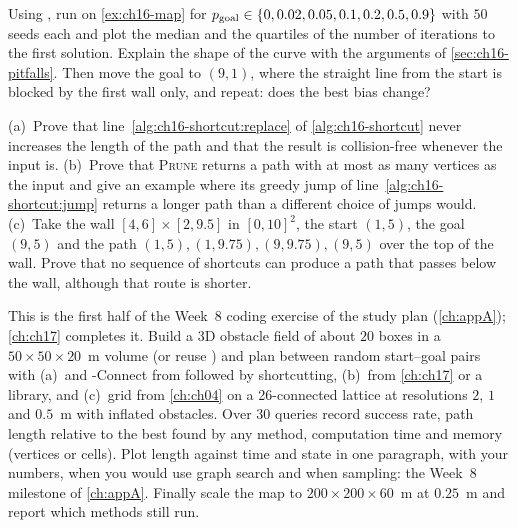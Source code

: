 \begin{exercise}
\label{exr:ch16-goalbias}
Using , run \rrt on \cref{ex:ch16-map} for
$p_{\mathrm{goal}}\in\left\{ 0,0.02,0.05,0.1,0.2,0.5,0.9 \right\}$ with $50$ seeds each
and plot the median and the quartiles of the number of iterations to the
first solution. Explain the shape of the curve with the arguments of
\cref{sec:ch16-pitfalls}. Then move the goal to $(9,1)$, where the straight
line from the start is blocked by the first wall only, and repeat: does the
best bias change?
\end{exercise}

\begin{exercise}[\difficulty{3}]
\label{exr:ch16-shortcut}
(a)~Prove that line~\ref{alg:ch16-shortcut:replace} of
\cref{alg:ch16-shortcut} never increases the length of the path and that
the result is collision-free whenever the input is. (b)~Prove that
\textsc{Prune} returns a path with at most as many vertices as the input and
give an example where its greedy jump of line~\ref{alg:ch16-shortcut:jump}
returns a longer path than a different choice of jumps would. (c)~Take the
wall $[4,6]\times[2,9.5]$ in $[0,10]^{2}$, the start $(1,5)$, the goal
$(9,5)$ and the path $(1,5),(1,9.75),(9,9.75),(9,5)$ over the top of the
wall. Prove that no sequence of shortcuts can produce a path that passes
below the wall, although that route is shorter.
\end{exercise}

\begin{exercise}
\label{exr:ch16-coding}
This is the first half of the Week~8 coding exercise of the study plan
(\cref{ch:appA}); \cref{ch:ch17} completes it. Build a 3D obstacle field of about $20$ boxes
in a $50\times50\times20$~m volume (or reuse ) and plan
between random start--goal pairs with (a)~\rrt and \rrt-Connect from
 followed by shortcutting, (b)~\rrtstar from
\cref{ch:ch17} or a library, and (c)~grid \astar from \cref{ch:ch04} on a
26-connected lattice at resolutions $2$, $1$ and $0.5$~m with inflated
obstacles. Over $30$ queries record success rate, path length relative to
the best found by any method, computation time and memory (vertices or
cells). Plot length against time and state in one paragraph, with your
numbers, when you would use graph search and when sampling: the Week~8
milestone of \cref{ch:appA}. Finally scale the map to
$200\times200\times60$~m at $0.25$~m and report which methods still run.
\end{exercise}
